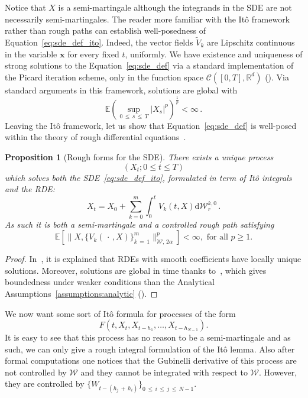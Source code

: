 \documentclass[11pt]{article}
\newtheorem{prop}[theo]{Proposition}
\theoremstyle{definition}
\numberwithin{equation}{section}
\numberwithin{figure}{section}
\numberwithin{table}{section}
\newcommand*\R{\mathbb{R}}
\newcommand*\E{\mathbb{E}}
\newcommand*\Cc{\mathcal{C}}
\newcommand*\Wc{\mathcal{W}}
\newcommand*\xb{\mathbf{x}}
\newcommand*{\dd}{\mathrm{d}}
\newcommand*{\dWc}{\dd \Wc}
\begin{document}
Notice that $X$ is a semi-martingale although the integrands in the SDE are not necessarily semi-martingales. The reader more familiar with the Itô framework rather than rough paths can establish well-posedness of Equation~\eqref{eq:sde_def_ito}. Indeed, the vector fields $\widetilde{V}_k$ are Lipschitz continuous in the variable $\xb$ for every fixed $t$, uniformly. We have existence and uniqueness of strong solutions to the Equation~\eqref{eq:sde_def} via a standard implementation of the Picard iteration scheme, only in the function space $\Cc\left([0,T], \R^d \right)$ (\cite[see the more general Theorem~4.6]{LiShi2001}). Via standard arguments in this framework, solutions are global with
\[
\E\left(\sup_{0\,\leq\,s\,\leq\,T} |X_s|^p \right)^{\frac{1}{p}} < \infty\,.
\]
Leaving the Itô framework, let us show that Equation~\eqref{eq:sde_def} is well-posed within the theory of rough differential equations~\cite[Chapter~8]{FH14}.

\begin{prop}[Rough forms for the SDE]
There exists a unique process
\[
(X_t ; 0 \leq t \leq T)
\]
which solves both the SDE~\eqref{eq:sde_def_ito}, formulated in term of Itô integrals and the RDE:
\begin{equation}\label{eq:sde_def_rough}
X_t = X_0 + \sum_{k=0}^m \int_0^t V_k(t,X) \dWc^{k,0}_r \, .
\end{equation}
As such it is both a semi-martingale and a controlled rough path satisfying
\[
\E\left[\| X,\{V_k(\,\cdot\,, X)\}_{k\,=\,1}^m\|_{\Wc,\,2\alpha}^p\right] < \infty, \text{ for all }p\geq 1.
\]
\end{prop}


\begin{proof}
In~\cite[Theorem~8.4]{FH14}, it is explained that RDEs with smooth coefficients have locally unique solutions. Moreover, solutions are global in time thanks to~\cite[Proposition~2]{lejay2012global}, which gives boundedness under weaker conditions than the Analytical Assumptions~\ref{assumptions:analytic} (\cite[Hypothesis 1]{lejay2012global}).
\end{proof}

We now want some sort of Itô formula for processes of the form
\[
F(t,X_t,X_{t-h_1},\dots, X_{t-h_{N-1}}).
\]
It is easy to see that this process has no reason to be a semi-martingale and as such, we can only give a rough integral formulation of the Itô lemma. Also after formal computations one notices that the Gubinelli derivative of this process are not controlled by $\Wc$ and they cannot be integrated with respect to $\Wc$. However, they are controlled by $\{W_{t-(h_j\,+\,h_i)}\}_{0\,\leq\,i\,\leq\,j\,\leq\,N-1}$.
\end{document}
